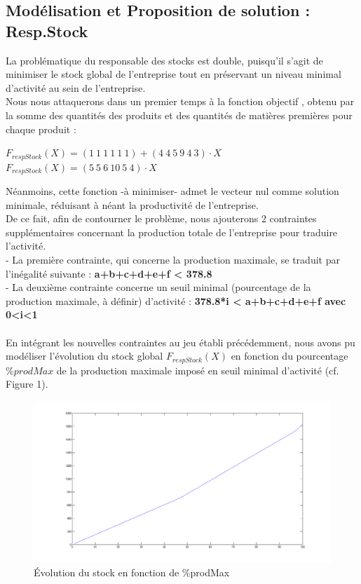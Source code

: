 \documentclass[a4paper, 11pt]{article}
\begin{document}
\subsection{Modélisation et Proposition de solution : Resp.Stock}
La problématique du responsable des stocks est double, puisqu'il s'agit de minimiser le stock global de l'entreprise tout en préservant un niveau minimal d'activité au sein de l'entreprise.\\
Nous nous attaquerons dans un premier temps à la fonction objectif , obtenu par la somme des quantités des produits et des quantités de matières premières pour chaque produit :
\begin{center}
$F_{respStock} (X) =(1~1~1~1~1~1)+(4~4~5~9~4~3)\cdot X$ \\
$F_{respStock} (X) =(5~5~6~10~5~4)\cdot X$\\
\end{center}
Néanmoins, cette fonction -à minimiser- admet le vecteur nul comme solution minimale, réduisant à néant la productivité de l'entreprise.\\
De ce fait, afin de contourner le problème, nous ajouterons 2 contraintes supplémentaires concernant la production totale de l'entreprise pour traduire l'activité.\\
- La première contrainte, qui concerne la production maximale, se traduit par l'inégalité suivante :
\textbf{a+b+c+d+e+f < 378.8}\\
- La deuxième contrainte concerne un seuil minimal (pourcentage de la production maximale, à définir) d'activité :
\textbf{ 378.8*i < a+b+c+d+e+f avec 0<i<1}\\
\\
En intégrant les nouvelles contraintes au jeu établi précédemment, nous avons pu modéliser l'évolution du stock global $F_{respStock} (X)$ en fonction du pourcentage $\%prodMax$ de la production maximale imposé en seuil minimal d'activité (cf. Figure 1).\\
\begin{figure}[position]
    \begin{center}
        \includegraphics[scale=0.35]{Stock}
        \caption{
            \label{fig} Évolution du stock en fonction de \%prodMax
        }
    \end{center}
\end{figure}
\end{document}
